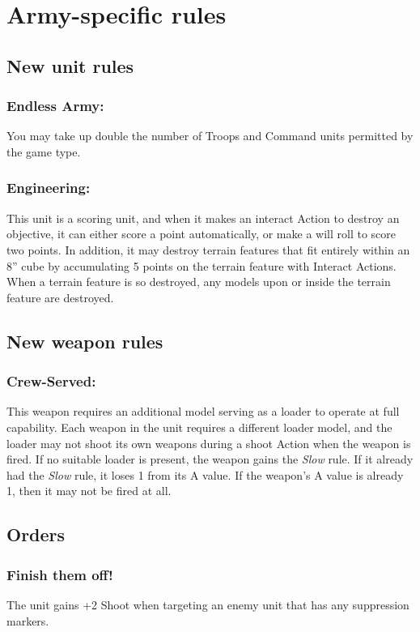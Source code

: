 \section*{Army-specific rules}

\subsection*{New unit rules}

\subsubsection*{Endless Army:} You may take up double the number of Troops and Command units permitted by the game type.

\subsubsection*{Engineering:} This unit is a scoring unit, and when it makes an interact Action to destroy an objective, it can either score a point automatically, or make a will roll to score two points. In addition, it may destroy terrain features that fit entirely within an 8'' cube by accumulating 5 points on the terrain feature with Interact Actions. When a terrain feature is so destroyed, any models upon or inside the terrain feature are destroyed.

\subsection*{New weapon rules}

\subsubsection*{Crew-Served:} This weapon requires an additional model serving as a loader to operate at full capability. Each weapon in the unit requires a different loader model, and the loader may not shoot its own weapons during a shoot Action when the weapon is fired. If no suitable loader is present, the weapon gains the \textit{Slow} rule. If it already had the \textit{Slow} rule, it loses 1 from its A value. If the weapon's A value is already 1, then it may not be fired at all.

\subsection*{Orders}

\subsubsection*{Finish them off!} The unit gains +2 Shoot when targeting an enemy unit that has any suppression markers.

